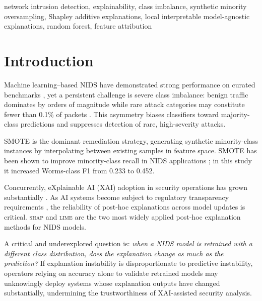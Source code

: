 \documentclass[conference,a4paper]{IEEEtran}
\newcommand{\SHAP}{\textsc{shap}\xspace}
\newcommand{\LIME}{\textsc{lime}\xspace}
\newcommand{\NIDS}{NIDS\xspace}
\newcommand{\SMOTE}{SMOTE\xspace}
\newcommand{\XAI}{XAI\xspace}
\begin{document}
\begin{IEEEkeywords}
network intrusion detection, explainability, class imbalance,
synthetic minority oversampling, Shapley additive explanations,
local interpretable model-agnostic explanations, random forest,
feature attribution
\end{IEEEkeywords}

\section{Introduction}

Machine learning--based \NIDS have demonstrated strong performance on curated
benchmarks \cite{alshamy2021,wu2022,more2024}, yet a persistent challenge is
severe class imbalance: benign traffic dominates by orders of magnitude while rare
attack categories may constitute fewer than 0.1\% of packets
\cite{moustafa2015,shanmugam2025}. This asymmetry biases classifiers toward
majority-class predictions and suppresses detection of rare, high-severity attacks.

\SMOTE \cite{chawla2002} is the dominant remediation strategy, generating
synthetic minority-class instances by interpolating between existing samples in
feature space. \SMOTE has been shown to improve minority-class recall in \NIDS
applications \cite{alshamy2021,sayegh2024}; in this study it increased Worms-class
F1 from 0.233 to 0.452.

Concurrently, eXplainable AI (\XAI) adoption in security operations has grown
substantially \cite{charmet2022,rjoub2023}. As AI systems become subject to
regulatory transparency requirements \cite{euaiact2024}, the reliability of
post-hoc explanations across model updates is critical. \SHAP
\cite{lundberg2017,lundberg2020} and \LIME
\cite{ribeiro2016,gaspar2024,hermosilla2025a} are the two most widely applied
post-hoc explanation methods for \NIDS models.

A critical and underexplored question is: \emph{when a \NIDS model is retrained
with a different class distribution, does the explanation change as much as the
prediction?} If explanation instability is disproportionate to predictive
instability, operators relying on accuracy alone to validate retrained models may
unknowingly deploy systems whose explanation outputs have changed substantially,
undermining the trustworthiness of \XAI-assisted security analysis.
\end{document}
